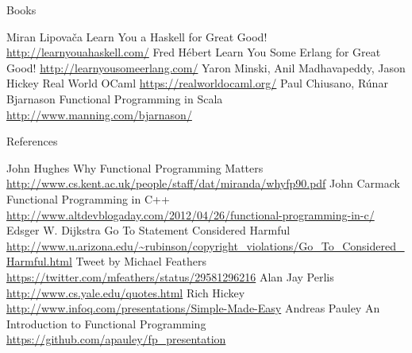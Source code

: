 \documentclass{beamer}
\begin{document}
\begin{frame}{Books}

  \begin{thebibliography}{10}
      Miran Lipovača
      \newblock Learn You a Haskell for Great Good!
      \newblock \url{http://learnyouahaskell.com/}
      Fred Hébert
      \newblock Learn You Some Erlang for Great Good!
      \newblock \url{http://learnyousomeerlang.com/}
      Yaron Minski, Anil Madhavapeddy, Jason Hickey
      \newblock Real World OCaml
      \newblock \url{https://realworldocaml.org/}
      Paul Chiusano, Rúnar Bjarnason
      \newblock Functional Programming in Scala
      \newblock \url{http://www.manning.com/bjarnason/}
  \end{thebibliography}

\end{frame}

\begin{frame}[allowframebreaks]{References}
  \begin{thebibliography}{10}
      John Hughes
      \newblock Why Functional Programming Matters
      \newblock \url{http://www.cs.kent.ac.uk/people/staff/dat/miranda/whyfp90.pdf}
      John Carmack
      \newblock Functional Programming in C++
      \newblock \url{http://www.altdevblogaday.com/2012/04/26/functional-programming-in-c/}
      Edsger W. Dijkstra
      \newblock Go To Statement Considered Harmful
      \newblock \url{http://www.u.arizona.edu/~rubinson/copyright_violations/Go_To_Considered_Harmful.html}
      Tweet by Michael Feathers
      \newblock \url{https://twitter.com/mfeathers/status/29581296216}
      Alan Jay Perlis
      \newblock \url{http://www.cs.yale.edu/quotes.html}
      Rich Hickey
      \newblock \url{http://www.infoq.com/presentations/Simple-Made-Easy}
      Andreas Pauley
      \newblock An Introduction to Functional Programming
      \newblock \url{https://github.com/apauley/fp_presentation}
  \end{thebibliography}
\end{frame}
\end{document}
